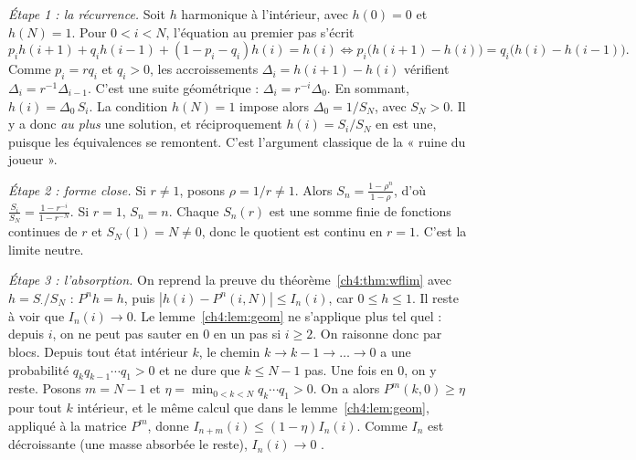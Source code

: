 \begin{humanproof}
\emph{Étape 1 : la récurrence.} Soit $h$ harmonique à l'intérieur, avec $h(0)=0$ et $h(N)=1$. Pour $0<i<N$,
l'équation au premier pas s'écrit
\[
p_ih(i+1)+q_ih(i-1)+(1-p_i-q_i)h(i)=h(i)\iff p_i\bigl(h(i+1)-h(i)\bigr)=q_i\bigl(h(i)-h(i-1)\bigr).
\]
Comme $p_i=rq_i$ et $q_i>0$, les accroissements $\Delta_i=h(i+1)-h(i)$ vérifient $\Delta_i=r^{-1}\Delta_{i-1}$.
C'est une suite géométrique : $\Delta_i=r^{-i}\Delta_0$. En sommant, $h(i)=\Delta_0\,S_i$. La condition $h(N)=1$
impose alors $\Delta_0=1/S_N$, avec $S_N>0$. Il y a donc \emph{au plus} une solution, et réciproquement
$h(i)=S_i/S_N$ en est une, puisque les équivalences se remontent. C'est l'argument classique de la « ruine du
joueur ».

\emph{Étape 2 : forme close.} Si $r\ne1$, posons $\rho=1/r\ne1$. Alors $S_n=\frac{1-\rho^n}{1-\rho}$, d'où
$\frac{S_i}{S_N}=\frac{1-r^{-i}}{1-r^{-N}}$. Si $r=1$, $S_n=n$. Chaque $S_n(r)$ est une somme finie de fonctions
continues de $r$ et $S_N(1)=N\ne0$, donc le quotient est continu en $r=1$. C'est la limite neutre.

\emph{Étape 3 : l'absorption.} On reprend la preuve du théorème~\ref{ch4:thm:wflim} avec $h=S_\cdot/S_N$ :
$P^nh=h$, puis $|h(i)-P^n(i,N)|\le I_n(i)$, car $0\le h\le1$. Il reste à voir que $I_n(i)\to0$. Le
lemme~\ref{ch4:lem:geom} ne s'applique plus tel quel : depuis $i$, on ne peut pas sauter en $0$ en un pas si
$i\ge2$. On raisonne donc par blocs. Depuis tout état intérieur $k$, le chemin $k\to k-1\to\dots\to0$ a une
probabilité $q_kq_{k-1}\cdots q_1>0$ et ne dure que $k\le N-1$ pas. Une fois en $0$, on y reste. Posons
$m=N-1$ et $\eta=\min_{0<k<N}q_k\cdots q_1>0$. On a alors $P^m(k,0)\ge\eta$ pour tout $k$ intérieur, et le même
calcul que dans le lemme~\ref{ch4:lem:geom}, appliqué à la matrice $P^m$, donne $I_{n+m}(i)\le(1-\eta)I_n(i)$.
Comme $I_n$ est décroissante (une masse absorbée le reste), $I_n(i)\to0$ \tierC.
\end{humanproof}


